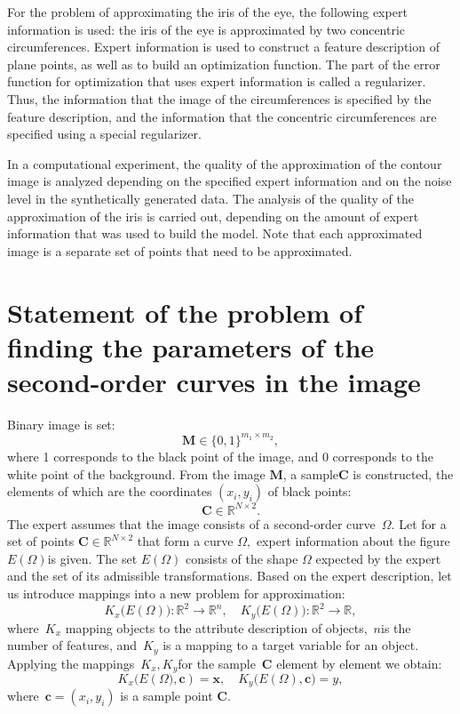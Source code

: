 For the problem of approximating the iris of the eye, the following expert information is used: the iris of the eye is approximated by two concentric circumferences. Expert information is used to construct a feature description of plane points, as well as to build an optimization function. The part of the error function for optimization that uses expert information is called a regularizer. Thus, the information that the image of the circumferences is specified by the feature description, and the information that the concentric circumferences are specified using a special regularizer.

In a computational experiment, the quality of the approximation of the contour image is analyzed depending on the specified expert information and on the noise level in the synthetically generated data. The analysis of the quality of the approximation of the iris is carried out, depending on the amount of expert information that was used to build the model. Note that each approximated image is a separate set of points that need to be approximated.

\section{Statement of the problem of finding the parameters of the second-order curves in the image}
\label{sec:1}
Binary image is set:
$$ \mathbf{M} \in \{0, 1 \}^{m_1\times m_2},$$
where 1 corresponds to the black point of the image, and 0 corresponds to the white point of the background.
From the image $\mathbf {M} $, a sample$ \mathbf{C}$ is constructed, the elements of which are the coordinates $(x_i, y_i)$ of black points: $$\mathbf{C} \in \mathbb{R}^{N \times 2}. $$
The expert assumes that the image consists of a second-order curve~$\Omega$.
Let for a set of points $\mathbf {C} \in \mathbb {R}^{N \times 2} $ that form a curve $\Omega, $ expert information about the figure $E(\Omega) $is given.
The set $E (\Omega)$ consists of the shape $\Omega$ expected by the expert and the set of its admissible transformations. Based on the expert description, let us introduce mappings into a new problem for approximation:
\begin{equation}\label{eq1}
	K_{x}\bigl(E(\Omega)\bigr): \mathbb{R}^{2} \rightarrow \mathbb{R}^{n}, \quad K_{y}\bigl(E(\Omega)\bigr): \mathbb{R}^{2} \rightarrow \mathbb{R},
\end{equation} 
where~$K_{x}$ mapping objects to the attribute description of objects,~$n$is the number of features, and~$K_ {y}$ is a mapping to a target variable for an object. Applying the mappings~$K_ {x}, K_{y}$for the sample~$\mathbf {C}$ element by element we obtain:
\begin{equation}
\label{eq2}
	K_{x}\bigl(E(\Omega\bigr), \mathbf{c}) = \mathbf{x}, \quad  K_{y}\bigl(E(\Omega), \mathbf{c}\bigr) = y,
\end{equation}
where~$\mathbf{c} = (x_i, y_i)$ is a sample point $\mathbf{C}$.


